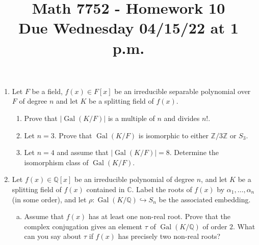 \documentclass[12pt,
psamsfonts]{amsart}
\title{Math 7752 - Homework 10\\
Due Wednesday 04/15/22 at 1 p.m.}
\theoremstyle{remark}
\theoremstyle{definition}
\newcommand{\Z}{\mathbb{Z}\xspace}
\newcommand{\Q}{\mathbb{Q}\xspace}
\newcommand{\C}{\mathbb{C}\xspace}
\DeclareMathOperator{\ch}{char}
\DeclareMathOperator{\Gal}{Gal}
\numberwithin{equation}{section}
\begin{document}
\maketitle



\begin{enumerate}
\item Let $F$ be a field, $f(x)\in F[x]$ be an irreducible separable polynomial over $F$ of degree $n$ and let $K$ be a splitting field of $f(x)$. 
\begin{enumerate}
\item Prove that $|\Gal(K/F)|$ is a multiple of $n$ and divides $n!$. 
\item Let $n=3$. Prove that $\Gal(K/F)$ is isomorphic to either $\Z/3\Z$ or $S_3$. 
\item Let $n=4$ and assume that $|\Gal(K/F)|=8$. Determine the isomorphism class of $\Gal(K/F)$.  
\end{enumerate} 
\medskip 
\medskip 
\item Let $f(x)\in\Q[x]$ be an irreducible polynomial of degree $n$, and let $K$ be a splitting field of $f(x)$ contained in $\C$. Label the roots of $f(x)$ by $\alpha_1,\ldots, \alpha_n$ (in some order), and let $\rho:\Gal(K/\Q)\hookrightarrow S_n$ be the associated embedding. 
 \begin{enumerate}
[(a)]\item Assume that $f(x)$ has at least one non-real root. Prove that the complex conjugation gives an element $\tau$ of $\Gal(K/\Q)$ of order $2$. What can you say about $\tau$ if $f(x)$ has precisely two non-real roots?

\end{enumerate}
\end{enumerate}
\end{document}
